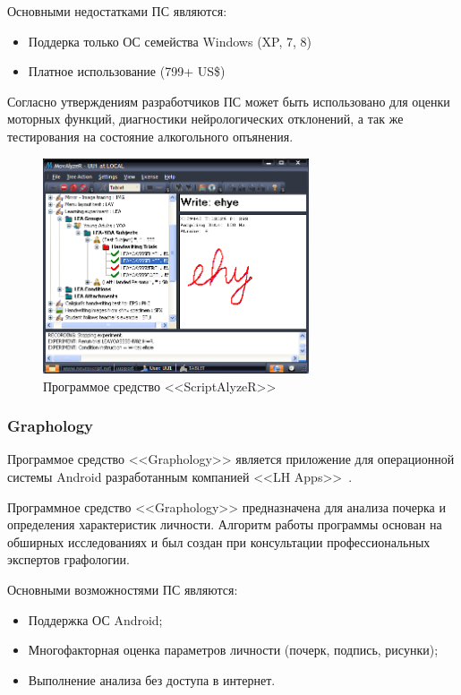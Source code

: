 Основными недостатками ПС являются:
\begin{itemize}
  \item Поддерка только ОС семейства Windows (XP, 7, 8)
  \item Платное использование (799+ US\$)
\end{itemize}

Согласно утверждениям разработчиков ПС может быть использовано для оценки моторных функций, диагностики нейрологических отклонений, а так же тестирования на состояние алкогольного опъянения.

\begin{figure}[ht]
    \centering
    \label{fig:domain:analogs:neuro_script}
    \includegraphics[width=0.7\textwidth]{figures/neuroscript.png}
    \caption{Программое средство <<ScriptAlyzeR>>}
\end{figure}

\subsubsection{Graphology}
\label{sub:domain:analogs:graphology} 

Программое средство <<Graphology>> является приложение для операционной системы Android разработанным компанией <<LH Apps>>~\cite{analogs_graphology}.

Программное средство <<Graphology>> предназначена для анализа почерка и определения характеристик личности. Алгоритм работы программы основан на обширных исследованиях и был создан при консультации профессиональных экспертов графологии.

Основными возможностями ПС являются:
\begin{itemize}

  \item Поддержка ОС Android;
  \item Многофакторная оценка параметров личности (почерк, подпись, рисунки);
  \item Выполнение анализа без доступа в интернет.
\end{itemize}

